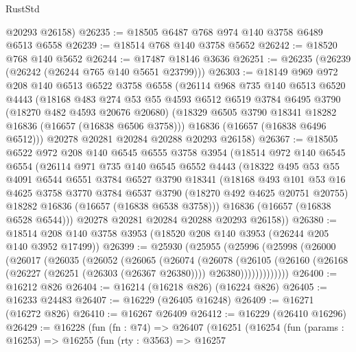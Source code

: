 \begin{lexlean}{RustStd}
\begin{coremodule}
      @20293
      @26158)
@26235 := @18505 @6487 @768 @974 @140 @3758 @6489 @6513 @6558
@26239 := @18514 @768 @140 @3758 @5652
@26242 := @18520 @768 @140 @5652
@26244 := @17487 @18146 @3636
@26251 := @26235 (@26239 (@26242 (@26244 @765 @140 @5651 @23799)))
@26303 := @18149
    @969
    @972
    @208
    @140
    @6513
    @6522
    @3758
    @6558
    (@26114
      @968
      @735
      @140
      @6513
      @6520
      @4443
      (@18168
        @483
        @274
        @53
        @55
        @4593
        @6512
        @6519
        @3784
        @6495
        @3790
        (@18270 @482 @4593 @20676 @20680)
        (@18329 @6505 @3790 @18341 @18282 @16836 (@16657 (@16838 @6506 @3758)))
        @16836
        (@16657 (@16838 @6496 @6512)))
      @20278
      @20281
      @20284
      @20288
      @20293
      @26158)
@26367 := @18505
    @6522
    @972
    @208
    @140
    @6545
    @6555
    @3758
    @3954
    (@18514
      @972
      @140
      @6545
      @6554
      (@26114
        @971
        @735
        @140
        @6545
        @6552
        @4443
        (@18322
          @495
          @53
          @55
          @4091
          @6544
          @6551
          @3784
          @6527
          @3790
          @18341
          (@18168
            @493
            @101
            @53
            @16
            @4625
            @3758
            @3770
            @3784
            @6537
            @3790
            (@18270 @492 @4625 @20751 @20755)
            @18282
            @16836
            (@16657 (@16838 @6538 @3758)))
          @16836
          (@16657 (@16838 @6528 @6544)))
        @20278
        @20281
        @20284
        @20288
        @20293
        @26158))
@26380 := @18514 @208 @140 @3758 @3953 (@18520 @208 @140 @3953 (@26244 @205 @140 @3952 @17499))
@26399 := @25930
    (@25955
      (@25996
        (@25998
          (@26000
            (@26017
              (@26035
                (@26052
                  (@26065
                    (@26074
                      (@26078
                        (@26105
                          (@26160
                            (@26168 (@26227 (@26251 (@26303 (@26367 @26380)))) @26380)))))))))))))
@26400 := @16212 @826
@26404 := @16214 (@16218 @826) (@16224 @826)
@26405 := @16233 @24483
@26407 := @16229 (@26405 @16248)
@26409 := @16271 (@16272 @826)
@26410 := @16267 @26409
@26412 := @16229 (@26410 @16296)
@26429 := @16228
    (fun (fn : @74) =>
    @26407
      (@16251
        (@16254
          (fun (params : @16253) =>
          @16255
            (fun (rty : @3563) =>
            @16257

\end{coremodule}
\end{lexlean}
